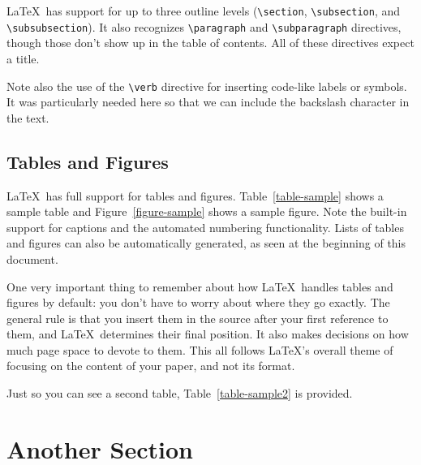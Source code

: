\documentclass{article}
\begin{document}
\LaTeX\ has support for up to three outline levels (\verb!\section!, \verb!\subsection!, and \verb!\subsubsection!).  It also recognizes \verb!\paragraph! and \verb!\subparagraph! directives, though those don't show up in the table of contents.  All of these directives expect a title.

Note also the use of the \verb!\verb! directive for inserting code-like labels or symbols.  It was particularly needed here so that we can include the backslash character in the text.

\subsection{Tables and Figures}

\LaTeX\ has full support for tables and figures.  Table~\ref{table-sample} shows a sample table and Figure~\ref{figure-sample} shows a sample figure.  Note the built-in support for captions and the automated numbering functionality.  Lists of tables and figures can also be automatically generated, as seen at the beginning of this document.




One very important thing to remember about how \LaTeX\ handles tables and figures by default: you don't have to worry about where they go exactly.  The general rule is that you insert them in the source after your first reference to them, and \LaTeX\ determines their final position.  It also makes decisions on how much page space to devote to them.  This all follows \LaTeX's overall theme of focusing on the content of your paper, and not its format.

Just so you can see a second table, Table~\ref{table-sample2} is provided.


\section{Another Section}
\end{document}
